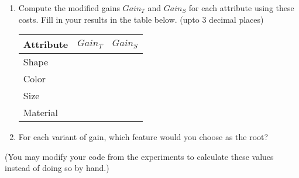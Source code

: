 \begin{enumerate}
\item \relax[8 points] Compute the modified gains $Gain_T$ and $Gain_S$ for each
  attribute using these costs. Fill in your results in the table below. (upto 3
  decimal places)


  \begin{center}
    \begin{tabular}{l|rr}
      Attribute & $Gain_T$ & $Gain_S$ \\\hline
      Shape     &          &          \\
      Color     &          &          \\
      Size      &          &          \\
      Material  &          &          \\\hline
    \end{tabular}
  \end{center}

\item \relax[2 points] For each variant of gain, which feature would you choose
  as the root?
\end{enumerate}

\noindent (You may modify your code from the experiments to calculate these
values instead of doing so by hand.)


